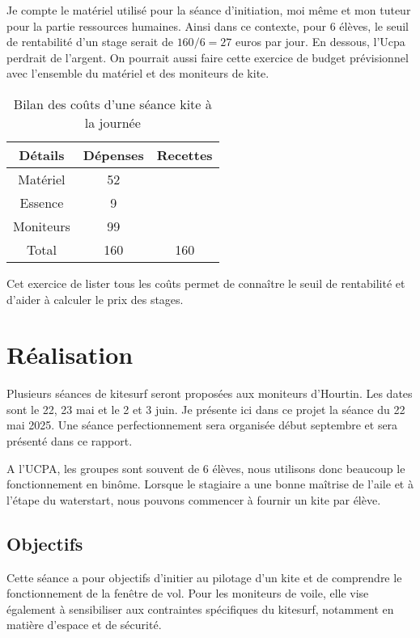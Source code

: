 \documentclass[11pt,a4paper]{report}
\begin{document}
Je compte le matériel utilisé pour la séance d’initiation,
moi m\^eme et mon tuteur pour la partie ressources humaines.
Ainsi dans ce contexte,  pour 6 élèves, le seuil de rentabilité
d'un stage serait de $160/6 = 27$ euros
par jour. En dessous, l'Ucpa perdrait de l'argent.
On pourrait aussi faire cette exercice de budget prévisionnel avec
l'ensemble du matériel et des moniteurs de kite.

\begin{table}
\begin{centering}
\begin{tabular}{|c|c|c|}
\hline
\textbf{Détails}         & \textbf{Dépenses} & \textbf{Recettes}   \\
\hline
Matériel  & 52     &                     \\
\hline                                    
Essence   & 9      &                     \\
\hline              
Moniteurs  & 99    &                     \\
\hline
Total     & 160    &       160           \\
\hline
\end{tabular}
\caption{Bilan des co\^uts d'une séance kite à la journée\label{cout_journalier}}
\end{centering}
\end{table}

Cet exercice de lister tous les co\^uts permet de connaître le seuil 
de rentabilité et d'aider à calculer le prix des stages.

\section{Réalisation}
Plusieurs séances de kitesurf seront proposées aux moniteurs d'Hourtin.
Les dates sont le 22, 23 mai et le 2 et 3 juin.
Je présente ici dans ce projet la séance du 22 mai 2025.
Une séance perfectionnement sera organisée début septembre
et sera présenté dans ce rapport.

A l'UCPA, les groupes sont souvent de 6 élèves, nous
utilisons donc beaucoup le fonctionnement en bin\^ome. 
Lorsque le stagiaire a une bonne maîtrise de l'aile et
à l'étape du waterstart, nous pouvons commencer à fournir
un kite par élève.
\subsection{Objectifs}
Cette séance a pour objectifs d’initier au pilotage d’un kite et
de comprendre le fonctionnement de la fenêtre de vol. 
Pour les moniteurs de voile, elle vise également à 
sensibiliser aux contraintes spécifiques du kitesurf, 
notamment en matière d’espace et de sécurité.
 
\end{document}
